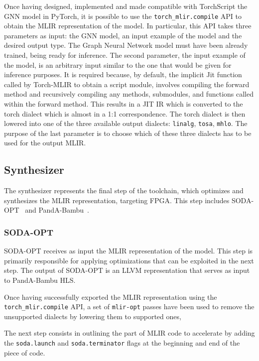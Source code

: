 \documentclass[11pt,a4paper,twocolumn]{article}
\begin{document}
Once having designed, implemented and made compatible with TorchScript the GNN model in PyTorch, it is possible to use the \texttt{torch\_mlir.compile} API to obtain the MLIR representation of the model.
In particular, this API takes three parameters as input: the GNN model, an input example of the model and the desired output type.
The Graph Neural Network model must have been already trained, being ready for inference.
The second parameter, the input example of the model, is an arbitrary input similar to the one that would be given for inference purposes.
It is required because, by default, the implicit Jit function called by Torch-MLIR to obtain a script module, involves compiling the forward method and recursively compiling any methods, submodules, and functions called within the forward method.
This results in a JIT IR which is converted to the torch dialect which is almost in a 1:1 correspondence.
The torch dialect is then lowered into one of the three available output dialects: \texttt{linalg}, \texttt{tosa}, \texttt{mhlo}.
The purpose of the last parameter is to choose which of these three dialects has to be used for the output MLIR\@.

\subsection{Synthesizer}
\label{subsec:synthesizer-toolchain}%

The synthesizer represents the final step of the toolchain, which optimizes and synthesizes the MLIR representation, targeting FPGA\@.
This step includes SODA-OPT~\cite{9786533} and PandA-Bambu~\cite{9586110}.

\subsubsection*{SODA-OPT}
\label{subsec:soda-opt}%

SODA-OPT receives as input the MLIR representation of the model.
This step is primarily responsible for applying optimizations that can be exploited in the next step.
The output of SODA-OPT is an LLVM representation that serves as input to PandA-Bambu HLS\@.

Once having successfully exported the MLIR representation using the \texttt{torch\_mlir.compile} API, a set of \texttt{mlir-opt} passes have been used to remove the unsupported dialects by lowering them to supported ones,

The next step consists in outlining the part of MLIR code to accelerate by adding the \lstinline{soda.launch} and \lstinline{soda.terminator} flags at the beginning and end of the piece of code.
\end{document}
